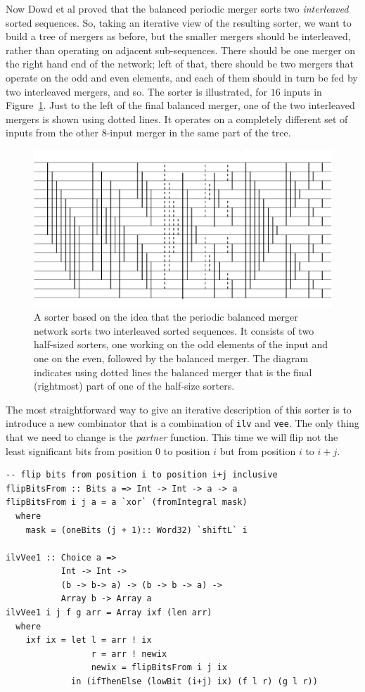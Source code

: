 \documentclass[]{sigplanconf}
\begin{document}
Now Dowd et al proved that the balanced periodic merger sorts two {\em interleaved} sorted sequences. So, taking an iterative view of the resulting sorter,
we want to build a tree of mergers as before, but the smaller mergers should
be interleaved, rather than operating on adjacent sub-sequences.
There should be one merger on the right hand end of the network; left of
that, there should be two mergers that operate on the odd and even elements,
and each of them should in turn be fed by two interleaved mergers, and so.
The sorter is illustrated, for $16$ inputs in Figure~\ref{fig:vsorter}.
Just to the left of the final balanced merger, one of the two interleaved
mergers is shown using dotted lines. It operates on a completely different set of inputs from the other 8-input merger in the same part of the tree.

\begin{figure}
\centering
\includegraphics[scale=0.5]{vsorter}
\caption{A sorter based on the idea that the periodic
balanced merger network sorts two interleaved sorted sequences.
It consists of two half-sized sorters, one working on the
odd elements of the input and one on the even, followed by
the balanced merger. The diagram indicates using dotted lines the
balanced merger that is the final (rightmost) part of
one of the half-size sorters.}
\label{fig:vsorter}
\end{figure}

The most straightforward way to give an iterative description of
this sorter is
to introduce a new combinator that is a combination of
{\tt ilv} and {\tt vee}.
The only thing that we need to change is the {\em partner} function.
This time we will flip not the least significant bits from position $0$ to
position $i$ but from position $i$ to $i+j$.

\begin{codesize}
\begin{verbatim}
-- flip bits from position i to position i+j inclusive
flipBitsFrom :: Bits a => Int -> Int -> a -> a
flipBitsFrom i j a = a `xor` (fromIntegral mask)
  where
    mask = (oneBits (j + 1):: Word32) `shiftL` i

ilvVee1 :: Choice a => 
           Int -> Int -> 
           (b -> b-> a) -> (b -> b -> a) -> 
           Array b -> Array a
ilvVee1 i j f g arr = Array ixf (len arr)
  where
    ixf ix = let l = arr ! ix
                 r = arr ! newix
                 newix = flipBitsFrom i j ix
             in (ifThenElse (lowBit (i+j) ix) (f l r) (g l r))
\end{verbatim}
\end{codesize}
\end{document}
